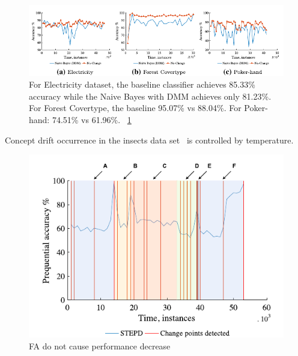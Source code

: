 \begin{figure}[htb!]
	\centering
	\includegraphics[height=0.15\textheight]{images/images_cropped/souza_fig7}
	\caption{
For Electricity dataset, the baseline classifier achieves 85.33\% accuracy while the Naive Bayes with DMM achieves only 81.23\%. For Forest Covertype, the baseline 95.07\% vs 88.04\%. For Poker-hand: 74.51\% vs 61.96\%.
~\ref{fig:fig7_souza}
	}\label{fig:fig7_souza}
\end{figure}

Concept drift occurrence in the insects data set~\cite{SouzaRMB20} is controlled by temperature.
\begin{figure}[htb!]
	\centering
	\includegraphics[height=0.4\textheight]{images/images_cropped/souza_fig28}
	\caption{FA do not cause performance decrease}
	\label{fig:fig28_souza}
\end{figure}

